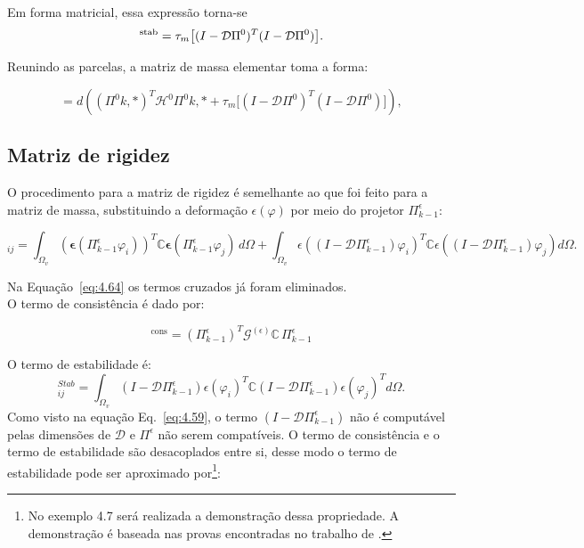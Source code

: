     \indent Em forma matricial, essa expressão torna-se
    \begin{equation}
        [M]^{\rm stab}=\tau_m\bigl[(I - \mathcal{D}\Pi^0)^T(I - \mathcal{D}\Pi^0)\bigr].
        \label{eq:4.61}
    \end{equation}

    \indent Reunindo as parcelas, a matriz de massa elementar toma a forma:

    \begin{equation}
        [M] = d \left( \left(\Pi^0{k,*}\right)^T\mathcal{H}^0\Pi^0{k,*} + \tau_m\bigl[(I - \mathcal{D}\Pi^0)^T(I - \mathcal{D}\Pi^0)\bigr] \right),
        \label{eq:4.62}
    \end{equation}  

\subsection{Matriz de rigidez}	

    \indent O procedimento para a matriz de rigidez é semelhante ao que foi feito para a matriz de massa, substituindo a deformação ${\epsilon}(\varphi)$ por meio do projetor $\Pi_{k-1}^\epsilon$: 

    \begin{equation}
        [K]_{ij} = \int_{\Omega_v} (\boldsymbol{\epsilon}(\Pi_{k-1}^\epsilon \varphi_i))^T \mathbb{C} \boldsymbol{\epsilon}(\Pi_{k-1}^\epsilon \varphi_j) \, d\Omega + \int_{\Omega_v} \epsilon\left( (I - \mathcal{D}\Pi_{k-1}^\epsilon) \varphi_i \right)^T \mathbb{C} \epsilon\left( (I - \mathcal{D}\Pi_{k-1}^\epsilon) \varphi_j \right) d\Omega.
        \label{eq:4.64}
    \end{equation}

    \noindent Na Equação~\ref{eq:4.64} os termos cruzados já foram eliminados.\\
    \indent O termo de consistência é dado por:
    
    \begin{equation}
        [K]^{\text{cons}} = (\Pi_{k-1}^{\epsilon})^T \mathcal{G}^{(\epsilon)} \mathbb{C} \, \Pi_{k-1}^{\epsilon}
        \label{eq:4.65}
    \end{equation}

    \indent O termo de estabilidade é:
    \begin{equation}
        [K]_{ij}^{Stab} = \int_{\Omega_v} (I - \mathcal{D}\Pi_{k-1}^{\epsilon})\epsilon\left(\varphi_i \right)^T \mathbb{C} (I - \mathcal{D}\Pi_{k-1}^{\epsilon})\epsilon\left(\varphi_j \right)^T  d\Omega.
    \end{equation}
    \indent Como visto na equação Eq.~\ref{eq:4.59}, o termo $(I - \mathcal{D}\Pi_{k-1}^{\epsilon})$ não é computável pelas dimensões de $\mathcal{D}$ e $\Pi^{\epsilon}$ não serem compatíveis. O termo de consistência e o termo de estabilidade são desacoplados entre si, desse modo o termo de estabilidade pode ser aproximado por\footnote{No exemplo 4.7 será realizada a demonstração dessa propriedade. A demonstração é baseada nas provas encontradas no trabalho de \citet{basicprinciplesvirtualelementmethods2013a}.}: 

